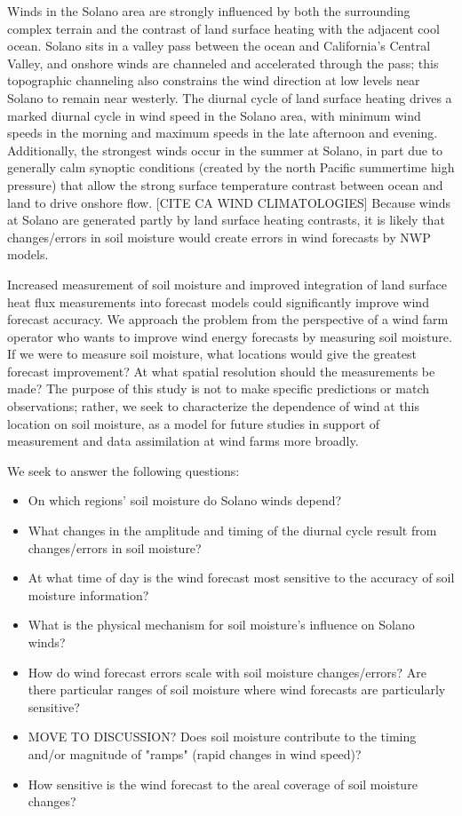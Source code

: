\documentclass[12pt]{amsart}
\begin{document}
Winds in the Solano area are strongly influenced by both the surrounding complex terrain and the contrast of land surface heating with the adjacent cool ocean.  Solano sits in a valley pass between the ocean and California's Central Valley, and onshore winds are channeled and accelerated through the pass; this topographic channeling also constrains the wind direction at low levels near Solano to remain near westerly.  The diurnal cycle of land surface heating drives a marked diurnal cycle in wind speed in the Solano area, with minimum wind speeds in the morning and maximum speeds in the late afternoon and evening.  Additionally, the strongest winds occur in the summer at Solano, in part due to generally calm synoptic conditions (created by the north Pacific summertime high pressure) that allow the strong surface temperature contrast between ocean and land to drive onshore flow. [CITE CA WIND CLIMATOLOGIES]  Because winds at Solano are generated partly by land surface heating contrasts, it is likely that changes/errors in soil moisture would create errors in wind forecasts by NWP models.

Increased measurement of soil moisture and improved integration of land surface heat flux measurements into forecast models could significantly improve wind forecast accuracy.  We approach the problem from the perspective of a wind farm operator who wants to improve wind energy forecasts by measuring soil moisture.  If we were to measure soil moisture, what locations would give the greatest forecast improvement?  At what spatial resolution should the measurements be made?  The purpose of this study is not to make specific predictions or match observations; rather, we seek to characterize the dependence of wind at this location on soil moisture, as a model for future studies in support of measurement and data assimilation at wind farms more broadly.

We seek to answer the following questions:
\begin{itemize}
\item On which regions' soil moisture do Solano winds depend?
\item What changes in the amplitude and timing of the diurnal cycle result from changes/errors in soil moisture?
\item At what time of day is the wind forecast most sensitive to the accuracy of soil moisture information?
\item What is the physical mechanism for soil moisture's influence on Solano winds?
\item How do wind forecast errors scale with soil moisture changes/errors?  Are there particular ranges of soil moisture where wind forecasts are particularly sensitive?
\item MOVE TO DISCUSSION? Does soil moisture contribute to the timing and/or magnitude of "ramps" (rapid changes in wind speed)?
\item How sensitive is the wind forecast to the areal coverage of soil moisture changes?
\end{itemize}
\end{document}
